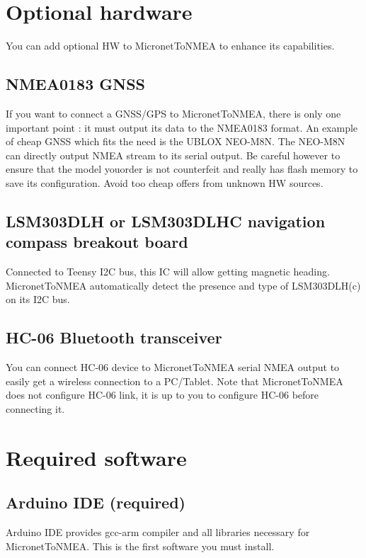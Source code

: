 \documentclass{report}
\begin{document}
\section{Optional hardware}

You can add optional HW to MicronetToNMEA to enhance its capabilities.

\subsection{NMEA0183 GNSS}

If you want to connect a GNSS/GPS to MicronetToNMEA, there is only one important point : it must output its data to the NMEA0183 format. An example of cheap GNSS which fits the need is the UBLOX NEO-M8N. The NEO-M8N can directly output NMEA stream to its serial output. Be careful however to ensure that the model youorder is not counterfeit and really has flash memory to save its configuration. Avoid too cheap offers from unknown HW sources.

\subsection{LSM303DLH or LSM303DLHC navigation compass breakout board}

Connected to Teensy I2C bus, this IC will allow getting magnetic heading. MicronetToNMEA automatically detect the presence and type of LSM303DLH(c) on its I2C bus.

\subsection{HC-06 Bluetooth transceiver}

You can connect HC-06 device to MicronetToNMEA serial NMEA output to easily get a wireless connection to a PC/Tablet. Note that MicronetToNMEA does not configure HC-06 link, it is up to you to configure HC-06 before connecting it.

\section{Required software}

\subsection{Arduino IDE (required)}
Arduino IDE provides gcc-arm compiler and all libraries necessary for MicronetToNMEA. This is the first software you must install.
\end{document}
